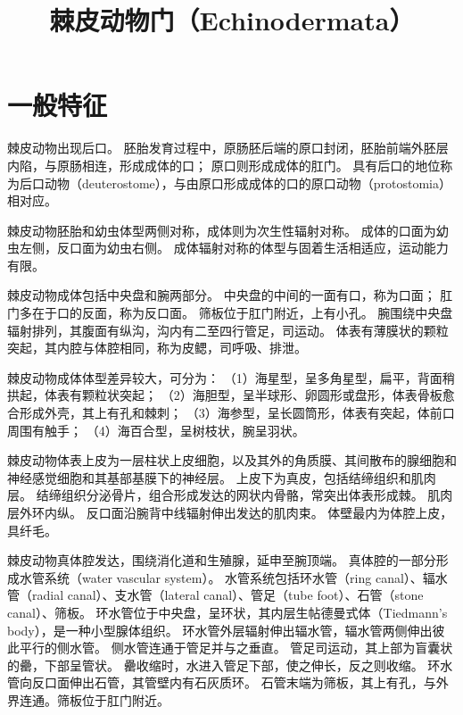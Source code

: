 \documentclass[11pt]{article}
\title{棘皮动物门（Echinodermata）}
\date{}
\begin{document}
  \maketitle

  \linenumbers
\section{一般特征}
棘皮动物出现后口。
胚胎发育过程中，原肠胚后端的原口封闭，胚胎前端外胚层内陷，与原肠相连，形成成体的口；
原口则形成成体的肛门。
具有后口的地位称为后口动物（deuterostome），与由原口形成成体的口的原口动物（protostomia）相对应。

\newline

棘皮动物胚胎和幼虫体型两侧对称，成体则为次生性辐射对称。
成体的口面为幼虫左侧，反口面为幼虫右侧。
成体辐射对称的体型与固着生活相适应，运动能力有限。

\newline

棘皮动物成体包括中央盘和腕两部分。
中央盘的中间的一面有口，称为口面；
肛门多在于口的反面，称为反口面。
筛板位于肛门附近，上有小孔。
腕围绕中央盘辐射排列，其腹面有纵沟，沟内有二至四行管足，司运动。
体表有薄膜状的颗粒突起，其内腔与体腔相同，称为皮鳃，司呼吸、排泄。

\newline

棘皮动物成体体型差异较大，可分为：
（1）海星型，呈多角星型，扁平，背面稍拱起，体表有颗粒状突起；
（2）海胆型，呈半球形、卵圆形或盘形，体表骨板愈合形成外壳，其上有孔和棘刺；
（3）海参型，呈长圆筒形，体表有突起，体前口周围有触手；
（4）海百合型，呈树枝状，腕呈羽状。

\newline

棘皮动物体表上皮为一层柱状上皮细胞，以及其外的角质膜、其间散布的腺细胞和神经感觉细胞和其基部基膜下的神经层。
上皮下为真皮，包括结缔组织和肌肉层。
结缔组织分泌骨片，组合形成发达的网状内骨骼，常突出体表形成棘。
肌肉层外环内纵。
反口面沿腕背中线辐射伸出发达的肌肉束。
体壁最内为体腔上皮，具纤毛。

\newline

棘皮动物真体腔发达，围绕消化道和生殖腺，延申至腕顶端。
真体腔的一部分形成水管系统（water vascular system）。
水管系统包括环水管（ring canal）、辐水管（radial canal）、支水管（lateral canal）、管足（tube foot）、石管（stone canal）、筛板。
环水管位于中央盘，呈环状，其内层生帖德曼式体（Tiedmann’s body），是一种小型腺体组织。
环水管外层辐射伸出辐水管，辐水管两侧伸出彼此平行的侧水管。
侧水管连通于管足并与之垂直。
管足司运动，其上部为盲囊状的罍，下部呈管状。
罍收缩时，水进入管足下部，使之伸长，反之则收缩。
环水管向反口面伸出石管，其管壁内有石灰质环。
石管末端为筛板，其上有孔，与外界连通。筛板位于肛门附近。
\end{document}

